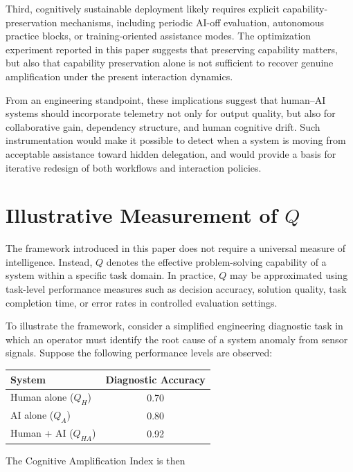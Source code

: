 \documentclass[11pt,a4paper]{article}
\begin{document}
Third, cognitively sustainable deployment likely requires explicit capability-preservation mechanisms, including periodic AI-off evaluation, autonomous practice blocks, or training-oriented assistance modes. The optimization experiment reported in this paper suggests that preserving capability matters, but also that capability preservation alone is not sufficient to recover genuine amplification under the present interaction dynamics.

From an engineering standpoint, these implications suggest that human--AI systems should incorporate telemetry not only for output quality, but also for collaborative gain, dependency structure, and human cognitive drift. Such instrumentation would make it possible to detect when a system is moving from acceptable assistance toward hidden delegation, and would provide a basis for iterative redesign of both workflows and interaction policies.\cite{designing-intelligent-organization,automation-bias-ai-act}

\section{\texorpdfstring{Illustrative Measurement of $Q$}{Illustrative Measurement of Q}}

The framework introduced in this paper does not require a universal measure of intelligence. Instead, $Q$ denotes the effective problem-solving capability of a system within a specific task domain. In practice, $Q$ may be approximated using task-level performance measures such as decision accuracy, solution quality, task completion time, or error rates in controlled evaluation settings.

To illustrate the framework, consider a simplified engineering diagnostic task in which an operator must identify the root cause of a system anomaly from sensor signals. Suppose the following performance levels are observed:

\begin{center}
\begin{tabular}{lc}
\toprule
System & Diagnostic Accuracy \\
\midrule
Human alone ($Q_H$) & 0.70 \\
AI alone ($Q_A$) & 0.80 \\
Human + AI ($Q_{HA}$) & 0.92 \\
\bottomrule
\end{tabular}
\end{center}

The Cognitive Amplification Index is then
\end{document}
